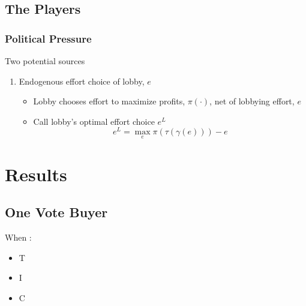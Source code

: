 \documentclass[handout]{beamer}
\newcommand{\ga}{\gamma}
\begin{document}
\subsection{The Players}


\begin{frame}
\frametitle{Political Pressure}
Two potential sources
\pause
\begin{enumerate}[<+->]
	\item Endogenous effort choice of lobby, $e$
		\begin{itemize}[<+->]
			\item Lobby chooses effort to maximize profits, $\pi(\cdot)$, net of lobbying effort, $e$
			\item Call lobby's optimal effort choice $e^L$
						\[
						  e^L = \max_e \pi(\tau(\ga(e))) - e
						\]
		\end{itemize}
\end{enumerate}

\end{frame}




\section{Results}
\subsection{One Vote Buyer}
\begin{frame}{}

\pause
When :

\pause
\begin{itemize}[<+->]
	\item T
	\item I
	\item C
\end{itemize}
\end{frame}
\end{document}
